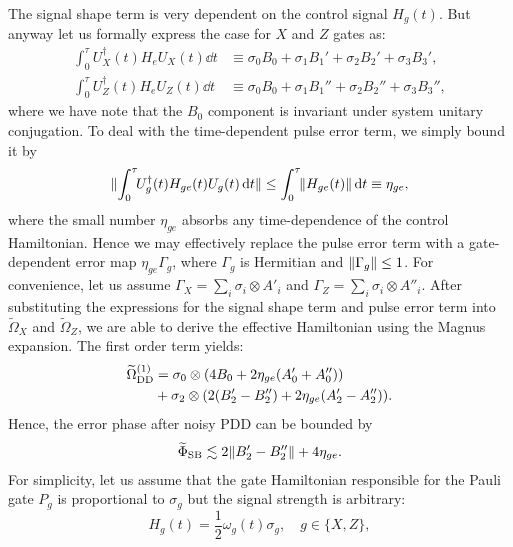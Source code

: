 \documentclass[pra,reprint,superscriptaddress]{revtex4-2}
\newcommand{\wt}[1]{\widetilde{#1}}
\newcommand{\rDD}{\mathrm{DD}}
\begin{document}
The signal shape term is very dependent on the control signal $H_g(t)$. But anyway let us formally express the case for $X$ and $Z$ gates as:
\begin{equation}\label{eq:sigshape-formal}
\begin{aligned}
\int_0^\tau\!\! U_X^\dagger(t) H_e U_X(t) \dd t &\equiv\sigma_0 B_0
 +\sigma_1 B_1' + \sigma_2 B_2'+\sigma_3 B_3',\\
\int_0^\tau\!\! U_Z^\dagger(t) H_e U_Z(t) \dd t &\equiv\sigma_0 B_0
 +\sigma_1 B_1'' + \sigma_2 B_2''+\sigma_3 B_3'',
 \end{aligned}
\end{equation}
where we have note that the $B_0$ component is invariant
under system unitary conjugation.
To deal with the time-dependent pulse error term,  we simply bound it by
\begin{equation}
 \Vert {\int_0^\tau\!\! U_g^\dagger(t) H_{ge}(t) U_g(t) \mathop{}\!\mathrm{d}t} \Vert 
 \le  \int_0^\tau\!\! \Vert {H_{ge}(t)} \Vert \mathop{}\!\mathrm{d} t \equiv  \eta_{ge},
\end{equation}
where the small number $\eta_{ge}$ absorbs any time-dependence of the control Hamiltonian.
Hence we may effectively replace the pulse error term with a gate-dependent error map $\eta_{ge} \Gamma_g$, where $\Gamma_g$ is Hermitian and $\Vert {\Gamma_g} \Vert\le 1$. For convenience, let us assume 
$\Gamma_X = \sum_i \sigma_i \otimes A'_i$ and
$\Gamma_Z = \sum_i \sigma_i \otimes A''_i$.
After substituting the expressions for the signal shape term and pulse error term into $\wt\Omega_X$ and $\wt\Omega_Z$, we are able to derive the 
effective Hamiltonian using the Magnus expansion. 
The first order term yields:
\begin{equation}
\begin{aligned}
  \wt\Omega_{\rDD}\up{1}&= 
  \sigma_0\otimes (4B_0 + 2\eta_{ge} (A_0'+A_0''))\\
 &+\sigma_2 \otimes (2(B_2' -B_2'')+2\eta_{ge}(A_2'-A_2'')).
\end{aligned}
\end{equation}
Hence, the error phase after noisy PDD can be bounded by
\begin{equation}\label{eq:nPDDeph1}
\begin{aligned}
  \wt\Phi_\rSB \lesssim 2\norm{B_2' -B_2''} + 4\eta_{ge}.
\end{aligned}
\end{equation}
For simplicity, let us assume that the gate Hamiltonian responsible for the Pauli gate $P_g$ is proportional to $\sigma_g$ but the signal strength is arbitrary:
\begin{equation}
 H_g(t) = \frac{1}{2}\omega_g(t)\sigma_g,\quad g\in\{X,Z\},
\end{equation}
\end{document}
